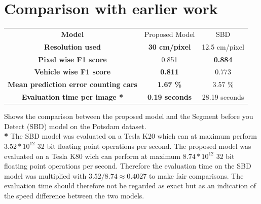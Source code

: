 \documentclass{kththesis}
\begin{document}
\section{Comparison with earlier work}
\newpage
\begin{center}
 \label{tab:potsdam} 
\begin{tabular}{|c | c | c|}
\hline
\textbf{Model} & Proposed Model & SBD \\
\textbf{Resolution used} & \textbf{30 cm/pixel} & 12.5 cm/pixel\\
\textbf{Pixel wise F1 score} & 0.851 & \textbf{0.884}\\
\textbf{Vehicle wise F1 score} & \textbf{0.811} &  0.773\\
\textbf{Mean prediction error counting cars} & \textbf{1.67 \%} &  3.57 \%\\
\textbf{Evaluation time per image *} & \textbf{0.19 seconds} &  28.19 seconds\\
\hline
\end{tabular}\caption{Shows the comparison between the proposed model and the Segment before you Detect (SBD) model \parencite{audebert_usability_2016} on the Potsdam dataset.\\ \textbf{*} The SBD model was evaluated on a Tesla K20 which can at maximum perform $3.52*10^{12}$ 32 bit floating point operations per second. The proposed model was evaluated on a Tesla K80 wich can perform at maximum $8.74*10^{12}$ 32 bit floating point operations per second. Therefore the evaluation time on the SBD model was multiplied with $3.52/8.74\approx0.4027$ to make fair comparisons. The evaluation time should therefore not be regarded as exact but as an indication of the speed difference between the two models.}
\end{center}
\end{document}

